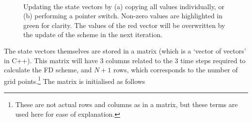 \begin{figure}[t]
    \centering
    \\
    \caption{Updating the state vectors by (a) copying all values individually, or (b) performing a pointer switch. Non-zero values are highlighted in green for clarity. The values of the red vector will be overwritten by the update of the scheme in the next iteration.\label{fig:pointerSwitchFull}}
\end{figure}

The state vectors themselves are stored in a matrix (which is a `vector of vectors' in C++). This matrix will have 3 columns related to the 3 time steps required to calculate the FD scheme, and $N+1$ rows, which corresponds to the number of grid points.\footnote{These are not actual rows and columns as in a matrix, but these terms are used here for ease of explanation.} The matrix is initialised as follows

